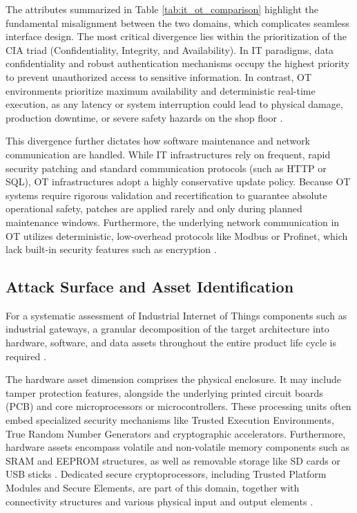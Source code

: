 The attributes summarized in Table \ref{tab:it_ot_comparison} highlight the fundamental misalignment between the two domains, which complicates seamless interface design. The most critical divergence lies within the prioritization of the CIA triad (Confidentiality, Integrity, and Availability). In IT paradigms, data confidentiality and robust authentication mechanisms occupy the highest priority to prevent unauthorized access to sensitive information. In contrast, OT environments prioritize maximum availability and deterministic real-time execution, as any latency or system interruption could lead to physical damage, production downtime, or severe safety hazards on the shop floor \cite[p. 1]{8586807} \cite{hwi_ot_definition}.

This divergence further dictates how software maintenance and network communication are handled. While IT infrastructures rely on frequent, rapid security patching and standard communication protocols (such as HTTP or SQL), OT infrastructures adopt a highly conservative update policy. Because OT systems require rigorous validation and recertification to guarantee absolute operational safety, patches are applied rarely and only during planned maintenance windows. Furthermore, the underlying network communication in OT utilizes deterministic, low-overhead protocols like Modbus or Profinet, which lack built-in security features such as encryption \cite{hwi_ot_definition}.


\subsection{Attack Surface and Asset Identification} 
\label{subsec:attack_surface_asset_identification} 

For a systematic assessment of Industrial Internet of Things components such as industrial gateways, a granular decomposition of the target architecture into hardware, software, and data assets throughout the entire product life cycle is required \cite[pp. 1]{liebl2024analyzingattacksurfacethreats}. 

The hardware asset dimension comprises the physical enclosure. It may include tamper protection features, alongside the underlying printed circuit boards (PCB) and core microprocessors or microcontrollers. These processing units often embed specialized security mechanisms like Trusted Execution Environments, True Random Number Generators and cryptographic accelerators. Furthermore, hardware assets encompass volatile and non-volatile memory components such as SRAM and EEPROM structures, as well as removable storage like SD cards or USB sticks \cite{liebl2024analyzingattacksurfacethreats}. Dedicated secure cryptoprocessors, including Trusted Platform Modules and Secure Elements, are part of this domain, together with connectivity structures and various physical input and output elements \cite[p. 3]{liebl2024analyzingattacksurfacethreats}.

